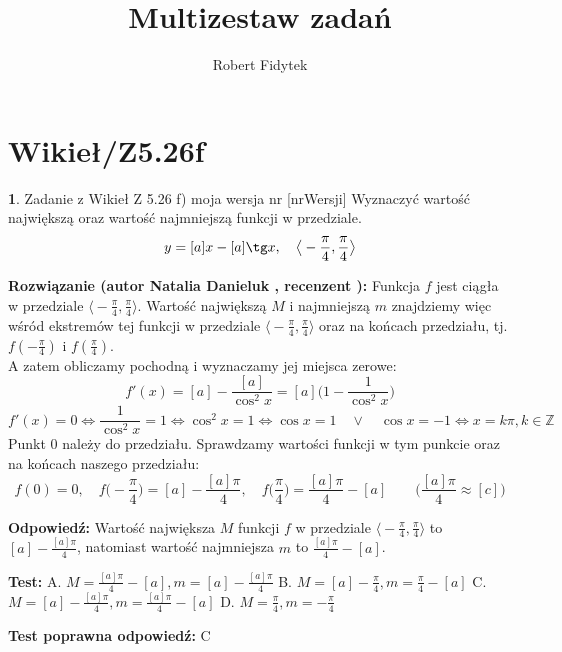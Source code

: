 \documentclass[12pt, a4paper]{article}
\title{Multizestaw zadań}
\author{Robert Fidytek}
\date{}
\theoremstyle{definition} %
\newtheorem{zad}{}
\newcommand{\kategoria}[1]{\section{#1}} %
\newcommand{\zadStart}[1]{\begin{zad}#1\newline} %
\newcommand{\zadStop}{\end{zad}}   %
\newcommand{\rozwStart}[2]{\noindent \textbf{Rozwiązanie (autor #1 , recenzent #2): }\newline} %
\newcommand{\rozwStop}{\newline}                                            %
\newcommand{\odpStart}{\noindent \textbf{Odpowiedź:}\newline}    %
\newcommand{\odpStop}{\newline}                                             %
\newcommand{\testStart}{\noindent \textbf{Test:}\newline} %
\newcommand{\testStop}{\newline} %
\newcommand{\kluczStart}{\noindent \textbf{Test poprawna odpowiedź:}\newline} %
\newcommand{\kluczStop}{\newline} %
\begin{document}
\maketitle

\kategoria{Wikieł/Z5.26f}

\zadStart{Zadanie z Wikieł Z 5.26 f) moja wersja nr [nrWersji]}
Wyznaczyć wartość największą oraz wartość najmniejszą funkcji w przedziale. 
$$y = [a]x - [a]\tg x, \quad \big\langle-\frac{\pi}{4},\frac{\pi}{4}\big\rangle$$
\zadStop

\rozwStart{Natalia Danieluk}{}
Funkcja $f$ jest ciągła w przedziale $\big\langle-\frac{\pi}{4},\frac{\pi}{4}\big\rangle$. Wartość największą $M$ i najmniejszą $m$ znajdziemy więc wśród ekstremów tej funkcji w przedziale $\big\langle-\frac{\pi}{4},\frac{\pi}{4}\big\rangle$ oraz na końcach przedziału, tj. $f(-\frac{\pi}{4})$ i $f(\frac{\pi}{4})$. \\
A zatem obliczamy pochodną i wyznaczamy jej miejsca zerowe:
$$ f'(x) = [a]-\frac{[a]}{\cos^2 x} = [a] \big (1-\frac{1}{\cos^2 x} \big ) $$
$$ f'(x) = 0 \Leftrightarrow \frac{1}{\cos^2 x} = 1 \Leftrightarrow \cos^2 x = 1 \Leftrightarrow \cos x = 1 \quad\vee\quad \cos x = -1 \Leftrightarrow x = k\pi, k \in \mathbb{Z} $$ 
Punkt $0$ należy do przedziału. Sprawdzamy wartości funkcji w tym punkcie oraz na końcach naszego przedziału: \\
$$ f(0) = 0,\quad f\big(-\frac{\pi}{4}\big) = [a] -\frac{[a]\pi}{4},\quad f\big(\frac{\pi}{4}\big) = \frac{[a]\pi}{4} - [a] \quad\quad \Big( \frac{[a]\pi}{4} \approx [c] \Big)$$
\rozwStop

\odpStart
Wartość największa $M$ funkcji $f$ w przedziale $\big\langle-\frac{\pi}{4},\frac{\pi}{4}\big\rangle$ to $[a] -\frac{[a]\pi}{4}$, natomiast wartość najmniejsza $m$ to $\frac{[a]\pi}{4} - [a]$.
\odpStop

\testStart
A. $M=\frac{[a]\pi}{4} - [a], m=[a] -\frac{[a]\pi}{4}$
B. $M=[a] -\frac{\pi}{4}, m=\frac{\pi}{4} - [a]$
C. $M=[a] -\frac{[a]\pi}{4}, m=\frac{[a]\pi}{4} - [a]$
D. $M=\frac{\pi}{4}, m=-\frac{\pi}{4}$
\testStop

\kluczStart
C
\kluczStop
\end{document}
